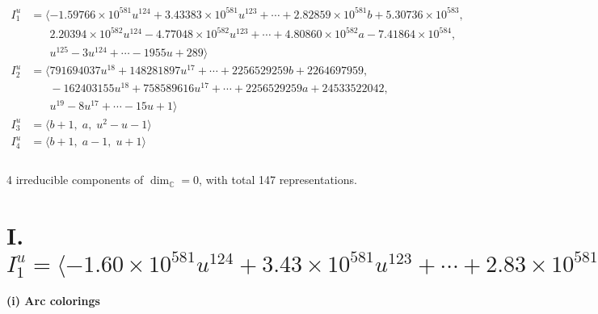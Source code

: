 \documentclass[1p]{elsarticle_modified}
\theoremstyle{definition}
\begin{document}
\begin{align*}
I^u_{1}&=\langle 
-1.59766\times10^{581} u^{124}+3.43383\times10^{581} u^{123}+\cdots+2.82859\times10^{581} b+5.30736\times10^{583},\\
\phantom{I^u_{1}}&\phantom{= \langle  }2.20394\times10^{582} u^{124}-4.77048\times10^{582} u^{123}+\cdots+4.80860\times10^{582} a-7.41864\times10^{584},\\
\phantom{I^u_{1}}&\phantom{= \langle  }u^{125}-3 u^{124}+\cdots-1955 u+289\rangle \\
I^u_{2}&=\langle 
791694037 u^{18}+148281897 u^{17}+\cdots+2256529259 b+2264697959,\\
\phantom{I^u_{2}}&\phantom{= \langle  }-162403155 u^{18}+758589616 u^{17}+\cdots+2256529259 a+24533522042,\\
\phantom{I^u_{2}}&\phantom{= \langle  }u^{19}-8 u^{17}+\cdots-15 u+1\rangle \\
I^u_{3}&=\langle 
b+1,\;a,\;u^2- u-1\rangle \\
I^u_{4}&=\langle 
b+1,\;a-1,\;u+1\rangle \\
\\
\end{align*}
\raggedright * 4 irreducible components of $\dim_{\mathbb{C}}=0$, with total 147 representations.\\
\newpage
\renewcommand{\arraystretch}{1}
\centering \section*{I. $I^u_{1}= \langle -1.60\times10^{581} u^{124}+3.43\times10^{581} u^{123}+\cdots+2.83\times10^{581} b+5.31\times10^{583},\;2.20\times10^{582} u^{124}-4.77\times10^{582} u^{123}+\cdots+4.81\times10^{582} a-7.42\times10^{584},\;u^{125}-3 u^{124}+\cdots-1955 u+289 \rangle$}
\flushleft \textbf{(i) Arc colorings}\\
\end{document}
